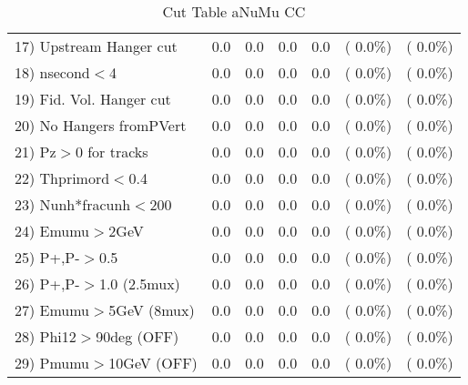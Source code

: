 \begin{table}[h!]
\begin{tabular}{||l||r|r|r|r|r|r||}
 17) Upstream Hanger cut  &          0.0 &          0.0 &          0.0 &          0.0 & (  0.0\%) & (  0.0\%) \\
 18) nsecond$<$4          &          0.0 &          0.0 &          0.0 &          0.0 & (  0.0\%) & (  0.0\%) \\
 19) Fid. Vol. Hanger cut &          0.0 &          0.0 &          0.0 &          0.0 & (  0.0\%) & (  0.0\%) \\
 20) No Hangers fromPVert &          0.0 &          0.0 &          0.0 &          0.0 & (  0.0\%) & (  0.0\%) \\
 21) Pz$>$0 for tracks    &          0.0 &          0.0 &          0.0 &          0.0 & (  0.0\%) & (  0.0\%) \\
 22) Thprimord$<$0.4      &          0.0 &          0.0 &          0.0 &          0.0 & (  0.0\%) & (  0.0\%) \\
 23) Nunh*fracunh$<$200   &          0.0 &          0.0 &          0.0 &          0.0 & (  0.0\%) & (  0.0\%) \\
 24) Emumu$>$2GeV         &          0.0 &          0.0 &          0.0 &          0.0 & (  0.0\%) & (  0.0\%) \\
 25) P+,P-$>$0.5          &          0.0 &          0.0 &          0.0 &          0.0 & (  0.0\%) & (  0.0\%) \\
 26) P+,P-$>$1.0 (2.5mux) &          0.0 &          0.0 &          0.0 &          0.0 & (  0.0\%) & (  0.0\%) \\
 27) Emumu$>$5GeV  (8mux) &          0.0 &          0.0 &          0.0 &          0.0 & (  0.0\%) & (  0.0\%) \\
 28) Phi12$>$90deg  (OFF) &          0.0 &          0.0 &          0.0 &          0.0 & (  0.0\%) & (  0.0\%) \\
 29) Pmumu$>$10GeV  (OFF) &          0.0 &          0.0 &          0.0 &          0.0 & (  0.0\%) & (  0.0\%) \\
 \hline
 \hline
 \end{tabular}
 \caption{Cut Table  aNuMu CC }
 \label{tab-cutcohjpsi-mumu_anumucc}
 \end{table}
